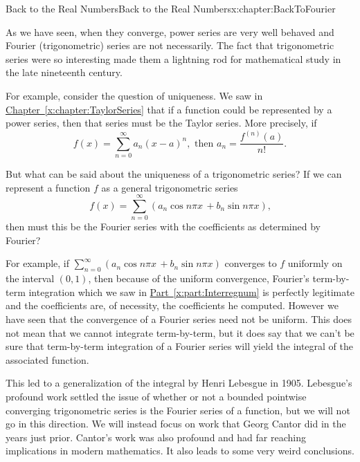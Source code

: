 \typeout{************************************************}
\typeout{************************************************}
%
\begin{chapterptx}{Back to the Real Numbers}{}{Back to the Real Numbers}{}{}{x:chapter:BackToFourier}
	\begin{introduction}{}%
		As we have seen, when they converge, power series are very well behaved and Fourier (trigonometric) series are not necessarily. The fact that trigonometric series were so interesting made them a lightning rod for mathematical study in the late nineteenth century.%
		\par
		For example, consider the question of uniqueness. We saw in \hyperref[x:chapter:TaylorSeries]{Chapter~{\xreffont\ref{x:chapter:TaylorSeries}}} that if a function could be represented by a power series, then that series must be the Taylor series. More precisely, if%
		\begin{equation*}
			f(x)=\sum_{n=0}^\infty a_n(x-a)^n, \text{  then  }  a_n=\frac{f^{(n)}(a)}{n!}\text{.}
		\end{equation*}
		\par
		But what can be said about the uniqueness of a trigonometric series? If we can represent a function \(f\) as a general trigonometric series%
		\begin{equation*}
			f(x)=\sum_{n=0}^\infty(a_n\cos n\pi x\,+b_n\sin n\pi x)\text{,}
		\end{equation*}
		then must this be the Fourier series with the coefficients as determined by Fourier? %
		\par
		For example, if \(\sum_{n=0}^\infty(a_n\cos n\pi x\,+b_n\sin n\pi x)\) converges to \(f\) uniformly on the interval \((0,1)\), then because of the uniform convergence, Fourier's term-by-term integration which we saw in \hyperref[x:part:Interregnum]{Part~{\xreffont\ref{x:part:Interregnum}}} is perfectly legitimate and the coefficients are, of necessity, the coefficients he computed. However we have seen that the convergence of a Fourier series need not be uniform. This does not mean that we cannot integrate term-by-term, but it does say that we can't be sure that term-by-term integration of a Fourier series will yield the integral of the associated function.%
		\par
		 This led to a generalization of the integral by Henri Lebesgue in 1905.  Lebesgue's profound work settled the issue of whether or not a bounded pointwise converging trigonometric series is the Fourier series of a function, but we will not go in this direction.  We will instead focus on work that Georg Cantor did in the years just prior. Cantor's work was also profound and had far reaching implications in modern mathematics.  It also leads to some very weird conclusions.%

\end{introduction}
\end{chapterptx}
